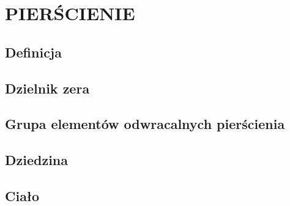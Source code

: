 \section{PIERŚCIENIE}

\subsection{Definicja}

\subsection{Dzielnik zera}

\subsection{Grupa elementów odwracalnych pierścienia}

\subsection{Dziedzina}

\subsection{Ciało}